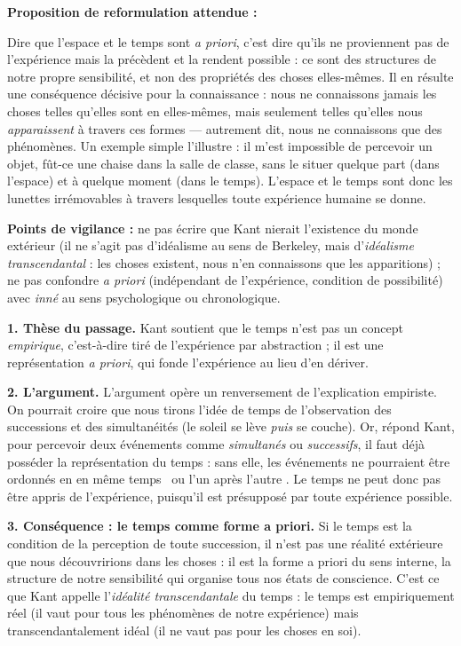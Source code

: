 \documentclass[11pt]{article}
\newcommand{\cle}[1]{{\popxbold\color{popdark}#1}}
\begin{document}
\begin{corrige}

\textbf{Proposition de reformulation attendue :}

Dire que l'espace et le temps sont \emph{a priori}, c'est dire qu'ils ne proviennent pas de l'expérience mais la précèdent et la rendent possible : ce sont des structures de notre propre sensibilité, et non des propriétés des choses elles-mêmes. Il en résulte une conséquence décisive pour la connaissance : nous ne connaissons jamais les choses telles qu'elles sont en elles-mêmes, mais seulement telles qu'elles nous \emph{apparaissent} à travers ces formes — autrement dit, nous ne connaissons que des \cle{phénomènes}. Un exemple simple l'illustre : il m'est impossible de percevoir un objet, fût-ce une chaise dans la salle de classe, sans le situer quelque part (dans l'espace) et à quelque moment (dans le temps). L'espace et le temps sont donc les lunettes irrémovables à travers lesquelles toute expérience humaine se donne.

\textbf{Points de vigilance :} ne pas écrire que Kant nierait l'existence du monde extérieur (il ne s'agit pas d'idéalisme au sens de Berkeley, mais d'\emph{idéalisme transcendantal} : les choses existent, nous n'en connaissons que les apparitions) ; ne pas confondre \emph{a priori} (indépendant de l'expérience, condition de possibilité) avec \emph{inné} au sens psychologique ou chronologique.
\end{corrige}

\begin{corrige}

\textbf{1. Thèse du passage.} Kant soutient que le temps n'est pas un concept \emph{empirique}, c'est-à-dire tiré de l'expérience par abstraction ; il est une représentation \emph{a priori}, qui fonde l'expérience au lieu d'en dériver.

\textbf{2. L'argument.} L'argument opère un renversement de l'explication empiriste. On pourrait croire que nous tirons l'idée de temps de l'observation des successions et des simultanéités (le soleil se lève \emph{puis} se couche). Or, répond Kant, pour percevoir deux événements comme \emph{simultanés} ou \emph{successifs}, il faut déjà posséder la représentation du temps : sans elle, les événements ne pourraient être ordonnés en \guillemotleft en même temps \guillemotright\ ou \guillemotleft l'un après l'autre \guillemotright. Le temps ne peut donc pas être appris de l'expérience, puisqu'il est présupposé par toute expérience possible.

\textbf{3. Conséquence : le temps comme forme a priori.} Si le temps est la condition de la perception de toute succession, il n'est pas une réalité extérieure que nous découvririons dans les choses : il est la \cle{forme a priori du sens interne}, la structure de notre sensibilité qui organise tous nos états de conscience. C'est ce que Kant appelle l'\emph{idéalité transcendantale} du temps : le temps est empiriquement réel (il vaut pour tous les phénomènes de notre expérience) mais transcendantalement idéal (il ne vaut pas pour les choses en soi).
\end{corrige}
\end{document}
